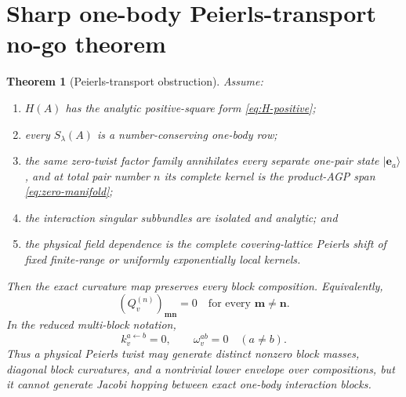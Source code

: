 \documentclass[11pt]{article}
\newtheorem{theorem}{Theorem}[section]
\theoremstyle{remark}
\newcommand{\be}{\mathbf e}
\begin{document}
\section{Sharp one-body Peierls-transport no-go theorem}

\begin{theorem}[Peierls-transport obstruction]
\label{thm:one-body-no-go}
Assume:
\begin{enumerate}[label=\textup{(H\arabic*)},leftmargin=3.8em]
 \item $H(A)$ has the analytic positive-square form \eqref{eq:H-positive};
 \item every $S_\lambda(A)$ is a number-conserving one-body row;
 \item the same zero-twist factor family annihilates every separate one-pair
       state $|\be_a\rangle$, and at total pair number $n$ its complete kernel
       is the product-AGP span \eqref{eq:zero-manifold};
 \item the interaction singular subbundles are isolated and analytic; and
 \item the physical field dependence is the complete covering-lattice Peierls
       shift of fixed finite-range or uniformly exponentially local kernels.
\end{enumerate}
Then the exact curvature map preserves every block composition.  Equivalently,
\begin{equation}
 \boxed{
 (Q_v^{(n)})_{\mathbf m\mathbf n}=0
 \quad\text{for every }\mathbf m\ne\mathbf n.}
 \label{eq:no-offdiag-Q}
\end{equation}
In the reduced multi-block notation,
\begin{equation}
 \boxed{
 k_v^{a\leftarrow b}=0,
 \qquad
 \omega_v^{ab}=0
 \quad(a\ne b).}
 \label{eq:no-transfer-data}
\end{equation}
Thus a physical Peierls twist may generate distinct nonzero block masses,
diagonal block curvatures, and a nontrivial lower envelope over compositions,
but it cannot generate Jacobi hopping between exact one-body interaction
blocks.
\end{theorem}
\end{document}
